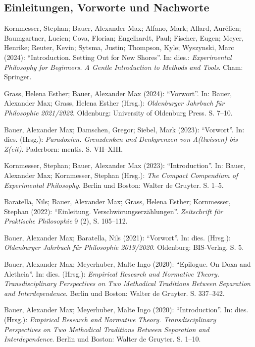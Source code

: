 \documentclass[a4paper,10pt]{article}
\newenvironment{literature}{%
   \parskip6pt\parindent0pt\raggedright
   \def\lititem{\hangindent=1cm\hangafter1}}{%
   \par\ignorespaces}
\begin{document}
\subsection*{Einleitungen, Vorworte und Nachworte}
\begin{literature}
\lititem Kornmesser, Stephan; Bauer, Alexander Max; Alfano, Mark; Allard, Aurélien; Baumgartner, Lucien; Cova, Florian; Engelhardt, Paul; Fischer, Eugen; Meyer, Henrike; Reuter, Kevin; Sytsma, Justin; Thompson, Kyle; Wyszynski, Marc (2024): \enquote{Introduction. Setting Out for New Shores}. In: dies.: \textit{Experimental Philosophy for Beginners. A Gentle Introduction to Methods and Tools}. Cham: Springer.

\lititem Grass, Helena Esther; Bauer, Alexander Max (2024): \enquote{Vorwort}. In: Bauer, Alexander Max; Grass, Helena Esther (Hrsg.): \textit{Oldenburger Jahrbuch für Philosophie 2021/2022}. Oldenburg: University of Oldenburg Press. S. 7--10.

\lititem Bauer, Alexander Max; Damschen, Gregor; Siebel, Mark (2023): \enquote{Vorwort}. In: dies. (Hrsg.): \textit{Paradoxien. Grenzdenken und Denkgrenzen von A(llwissen) bis Z(eit)}. Paderborn: mentis. S. VII--XIII.

\lititem Kornmesser, Stephan; Bauer, Alexander Max (2023): \enquote{Introduction}. In: Bauer, Alexander Max; Kornmesser, Stephan (Hrsg.): \textit{The Compact Compendium of Experimental Philosophy}. Berlin und Boston: Walter de Gruyter. S. 1--5.

\lititem Baratella, Nils; Bauer, Alexander Max; Grass, Helena Esther; Kornmesser, Stephan (2022): \enquote{Einleitung. Verschwörungserzählungen}. \textit{Zeitschrift für Praktische Philosophie} 9 (2), S. 105--112.

\lititem Bauer, Alexander Max; Baratella, Nils (2021): \enquote{Vorwort}. In: dies. (Hrsg.): \textit{Oldenburger Jahrbuch für Philosophie 2019/2020}. Oldenburg: BIS-Verlag. S. 5.

\lititem Bauer, Alexander Max; Meyerhuber, Malte Ingo (2020): \enquote{Epilogue. On Doxa and Aletheia}. In: dies. (Hrsg.): \textit{Empirical Research and Normative Theory. Transdisciplinary Perspectives on Two Methodical Traditions Between Separation and Interdependence}. Berlin und Boston: Walter de Gruyter. S. 337--342.

\lititem Bauer, Alexander Max; Meyerhuber, Malte Ingo (2020): \enquote{Introduction}. In: dies. (Hrsg.): \textit{Empirical Research and Normative Theory. Transdisciplinary Perspectives on Two Methodical Traditions Between Separation and Interdependence}. Berlin und Boston: Walter de Gruyter. S. 1--10.


\end{literature}
\end{document}
